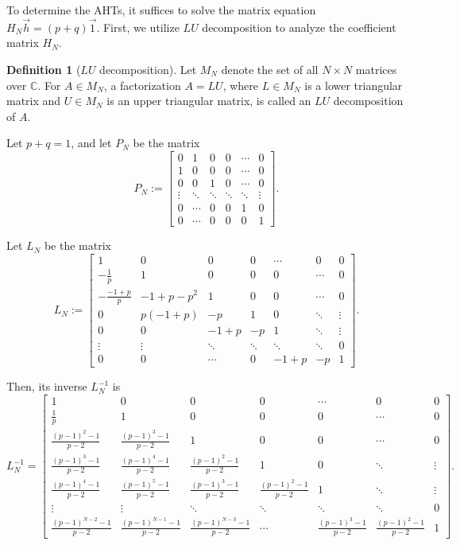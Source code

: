 \documentclass[12pt, leqno]{amsart}
\numberwithin{equation}{section}
\theoremstyle{plain}
\theoremstyle{definition}
\newtheorem{df}{Definition}[section]
\newcommand{\CC}{\mathbb{C}}
\newcommand{\0}{\mathbf{0}}
\begin{document}
To determine the AHTs, it suffices to solve the matrix equation $H_N\vec{h}=(p+q)\vec{1}$.
First, we utilize $LU$ decomposition to analyze the coefficient matrix $H_N$.

\begin{df}[$LU$ decomposition]
Let $M_N$ denote the set of all $N\times N$ matrices over $\CC$.
For $A\in M_N$, a factorization $A=LU$, where $L\in M_N$ is a lower triangular matrix and $U\in M_N$ is an upper triangular matrix, is called an $LU$ decomposition of $A$.
\end{df}

Let $p+q=1$, and let $P_N$ be the matrix
\[
P_N:=\begin{bmatrix}
0&1&0&0&\cdots&0 \\
1&0&0&0&\cdots&0 \\
0&0&1&0&\cdots&0 \\
\vdots&\ddots&\ddots&\ddots&\ddots&\vdots \\
0&\cdots&0&0&1&0\\
0&\cdots&0&0&0&1
\end{bmatrix}.
\]

Let $L_N$ be the matrix
\[
L_N:=\begin{bmatrix}
1&0&0&0&\cdots&0&0\\
-\frac{1}{p}&1&0&0&0&\cdots&0\\
-\frac{-1+p}{p}&-1+p-p^2&1&0&0&\cdots&0\\
0&p(-1+p)&-p&1&0&\ddots&\vdots\\
0&0&-1+p&-p&1&\ddots&\vdots\\
\vdots&\vdots&\ddots&\ddots&\ddots&\ddots&0\\
0&0&\cdots&0&-1+p&-p&1
\end{bmatrix}.
\]

Then, its inverse $L_N^{-1}$ is 
\[
L_N^{-1}=\begin{bmatrix}
1&0&0&0&\cdots&0&0\\
\frac{1}{p}&1&0&0&0&\cdots&0\\
\frac{(p-1)^2-1}{p-2}&\frac{(p-1)^3-1}{p-2}&1&0&0&\cdots&0\\
\frac{(p-1)^3-1}{p-2}&\frac{(p-1)^4-1}{p-2}&\frac{(p-1)^2-1}{p-2}&1&0&\ddots&\vdots\\
\frac{(p-1)^4-1}{p-2}&\frac{(p-1)^5-1}{p-2}&\frac{(p-1)^3-1}{p-2}&\frac{(p-1)^2-1}{p-2}&1&\ddots&\vdots\\
\vdots&\vdots&\ddots&\ddots&\ddots&\ddots&0\\
\frac{(p-1)^{N-2}-1}{p-2}&\frac{(p-1)^{N-1}-1}{p-2}&\frac{(p-1)^{N-3}-1}{p-2}&\cdots&\frac{(p-1)^3-1}{p-2}&\frac{(p-1)^2-1}{p-2}&1
\end{bmatrix}.
\]
\end{document}

